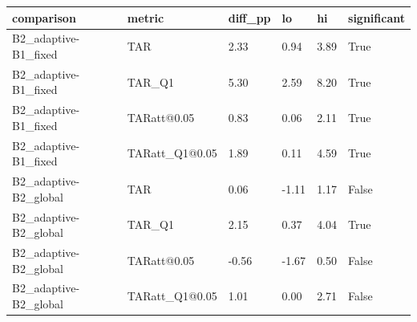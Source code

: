 \begin{tabular}{llllll}
\hline
comparison & metric & diff\_pp & lo & hi & significant \\
\hline
B2\_adaptive-B1\_fixed & TAR & 2.33 & 0.94 & 3.89 & True \\
B2\_adaptive-B1\_fixed & TAR\_Q1 & 5.30 & 2.59 & 8.20 & True \\
B2\_adaptive-B1\_fixed & TARatt@0.05 & 0.83 & 0.06 & 2.11 & True \\
B2\_adaptive-B1\_fixed & TARatt\_Q1@0.05 & 1.89 & 0.11 & 4.59 & True \\
B2\_adaptive-B2\_global & TAR & 0.06 & -1.11 & 1.17 & False \\
B2\_adaptive-B2\_global & TAR\_Q1 & 2.15 & 0.37 & 4.04 & True \\
B2\_adaptive-B2\_global & TARatt@0.05 & -0.56 & -1.67 & 0.50 & False \\
B2\_adaptive-B2\_global & TARatt\_Q1@0.05 & 1.01 & 0.00 & 2.71 & False \\
\hline
\end{tabular}
